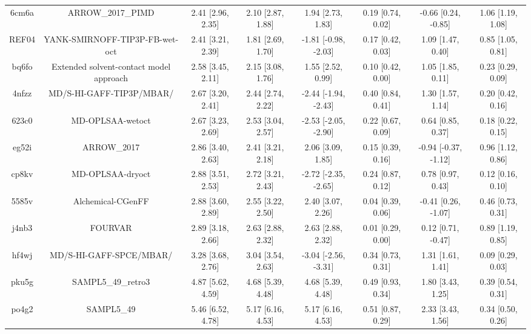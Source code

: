 \documentclass{article}
\begin{document}
\begin{center}
\begin{longtable}{|cccccccc|}
 6cm6a &                                  ARROW\_2017\_PIMD &  2.41 [2.96, 2.35] &  2.10 [2.87, 1.88] &     1.94 [2.73, 1.83] &  0.19 [0.74, 0.02] &   -0.66 [0.24, -0.85] &     1.06 [1.19, 1.08] \\
 REF04 &                     YANK-SMIRNOFF-TIP3P-FB-wet-oct &  2.41 [3.21, 2.39] &  1.81 [2.69, 1.70] &  -1.81 [-0.98, -2.03] &  0.17 [0.42, 0.03] &     1.09 [1.47, 0.40] &     0.85 [1.05, 0.81] \\
 bq6fo &            Extended solvent-contact model approach &  2.58 [3.45, 2.11] &  2.15 [3.08, 1.76] &     1.55 [2.52, 0.99] &  0.10 [0.42, 0.00] &     1.05 [1.85, 0.11] &     0.23 [0.29, 0.09] \\
 4nfzz &                           MD/S-HI-GAFF-TIP3P/MBAR/ &  2.67 [3.20, 2.41] &  2.44 [2.74, 2.22] &  -2.44 [-1.94, -2.43] &  0.40 [0.84, 0.41] &     1.30 [1.57, 1.14] &     0.20 [0.42, 0.16] \\
 623c0 &                                   MD-OPLSAA-wetoct &  2.67 [3.23, 2.69] &  2.53 [3.04, 2.57] &  -2.53 [-2.05, -2.90] &  0.22 [0.67, 0.09] &     0.64 [0.85, 0.37] &     0.18 [0.22, 0.15] \\
 eg52i &                                        ARROW\_2017 &  2.86 [3.40, 2.63] &  2.41 [3.21, 2.18] &     2.06 [3.09, 1.85] &  0.15 [0.39, 0.16] &  -0.94 [-0.37, -1.12] &     0.96 [1.12, 0.86] \\
 cp8kv &                                   MD-OPLSAA-dryoct &  2.88 [3.51, 2.53] &  2.72 [3.21, 2.43] &  -2.72 [-2.35, -2.65] &  0.24 [0.87, 0.12] &     0.78 [0.97, 0.43] &     0.12 [0.16, 0.10] \\
 5585v &                                  Alchemical-CGenFF &  2.88 [3.60, 2.89] &  2.55 [3.22, 2.50] &     2.40 [3.07, 2.26] &  0.04 [0.39, 0.06] &   -0.41 [0.26, -1.07] &     0.46 [0.73, 0.31] \\
 j4nb3 &                                            FOURVAR &  2.89 [3.18, 2.66] &  2.63 [2.88, 2.32] &     2.63 [2.88, 2.32] &  0.01 [0.29, 0.00] &    0.12 [0.71, -0.47] &     0.89 [1.19, 0.85] \\
 hf4wj &                            MD/S-HI-GAFF-SPCE/MBAR/ &  3.28 [3.68, 2.76] &  3.04 [3.54, 2.63] &  -3.04 [-2.56, -3.31] &  0.34 [0.73, 0.31] &     1.31 [1.61, 1.41] &     0.09 [0.29, 0.03] \\
 pku5g &                                 SAMPL5\_49\_retro3 &  4.87 [5.62, 4.59] &  4.68 [5.39, 4.48] &     4.68 [5.39, 4.48] &  0.49 [0.93, 0.34] &     1.80 [3.43, 1.25] &     0.39 [0.54, 0.31] \\
 po4g2 &                                         SAMPL5\_49 &  5.46 [6.52, 4.78] &  5.17 [6.16, 4.53] &     5.17 [6.16, 4.53] &  0.51 [0.87, 0.29] &     2.33 [3.43, 1.56] &     0.34 [0.50, 0.26] \\
\end{longtable}
\end{center}
\end{document}
